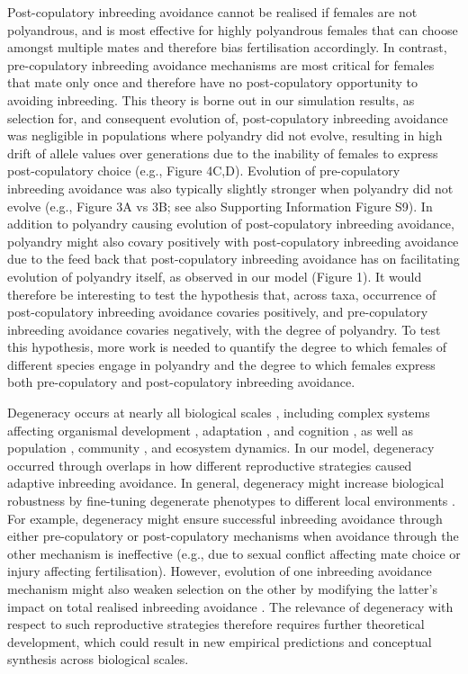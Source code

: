 \documentclass[12pt]{article}
\begin{document}
Post-copulatory inbreeding avoidance cannot be realised if females are not polyandrous, and is most effective for highly polyandrous females that can choose amongst multiple mates and therefore bias fertilisation accordingly. In contrast, pre-copulatory inbreeding avoidance mechanisms are most critical for females that mate only once and therefore have no post-copulatory opportunity to avoiding inbreeding. This theory is borne out in our simulation results, as selection for, and consequent evolution of, post-copulatory inbreeding avoidance was negligible in populations where polyandry did not evolve, resulting in high drift of allele values over generations due to the inability of females to express post-copulatory choice (e.g., Figure 4C,D). Evolution of pre-copulatory inbreeding avoidance was also typically slightly stronger when polyandry did not evolve (e.g., Figure 3A vs 3B; see also Supporting Information Figure S9). In addition to polyandry causing evolution of post-copulatory inbreeding avoidance, polyandry might also covary positively with post-copulatory inbreeding avoidance due to the feed back that post-copulatory inbreeding avoidance has on facilitating evolution of polyandry itself, as observed in our model (Figure 1). It would therefore be interesting to test the hypothesis that, across taxa, occurrence of post-copulatory inbreeding avoidance covaries positively, and pre-copulatory inbreeding avoidance covaries negatively, with the degree of polyandry. To test this hypothesis, more work is needed to quantify the degree to which females of different species engage in polyandry and the degree to which females express both pre-copulatory and post-copulatory inbreeding avoidance.

Degeneracy occurs at nearly all biological scales \cite[][]{Edelman2001}, including complex systems affecting organismal development \cite[e.g.,][]{Nowak1997}, adaptation \cite[][]{Whitacre2010, Whitacre2010a}, and cognition \cite[][]{Price2002, Park2013}, as well as population \cite[][]{Atamas2009}, community \cite[][]{Suraci2017}, and ecosystem \cite[e.g.,][]{Levin2008} dynamics. In our model, degeneracy occurred through overlaps in how different reproductive strategies caused adaptive inbreeding avoidance. In general, degeneracy might increase biological robustness by fine-tuning degenerate phenotypes to different local environments \cite[][]{Gardner2006, Whitacre2010a}. For example, degeneracy might ensure successful inbreeding avoidance through either pre-copulatory or post-copulatory mechanisms when avoidance through the other mechanism is ineffective (e.g., due to sexual conflict affecting mate choice or injury affecting fertilisation). However, evolution of one inbreeding avoidance mechanism might also weaken selection on the other by modifying the latter's impact on total realised inbreeding avoidance \cite[\textit{sensu} evolution of genetic redundancy; see][]{Nowak1997}. The relevance of degeneracy with respect to such reproductive strategies therefore requires further theoretical development, which could result in new empirical predictions and conceptual synthesis across biological scales. 
\end{document}
